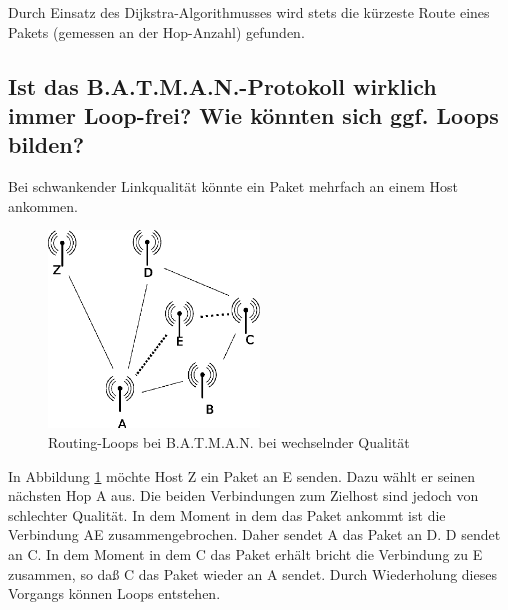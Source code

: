 \documentclass[a4paper,10pt]{article}
\begin{document}
Durch Einsatz des Dijkstra-Algorithmusses wird stets die kürzeste Route 
eines Pakets (gemessen an der Hop-Anzahl) gefunden.

\subsection{Ist das B.A.T.M.A.N.-Protokoll wirklich immer Loop-frei? Wie könnten sich ggf. Loops bilden?}

Bei schwankender Linkqualität könnte ein Paket mehrfach an einem Host ankommen.

\begin{figure}[thb]
 \begin{center}
   \includegraphics[width=0.5\textwidth]{loop-routing.png}
    \caption{Routing-Loops bei B.A.T.M.A.N. bei wechselnder Qualität}
    \label{batman-loop-air}
  \end{center}
\end{figure}

In Abbildung \ref{batman-loop-air} möchte Host Z ein Paket an E senden. Dazu wählt er seinen nächsten Hop A aus.
Die beiden Verbindungen zum Zielhost sind jedoch von schlechter Qualität.
In dem Moment in dem das Paket ankommt ist die Verbindung AE zusammengebrochen.
Daher sendet A das Paket an D.
D sendet an C.
In dem Moment in dem C das Paket erhält bricht die Verbindung zu E zusammen, so daß C das Paket wieder an A sendet.
Durch Wiederholung dieses Vorgangs können Loops entstehen.
\end{document}
